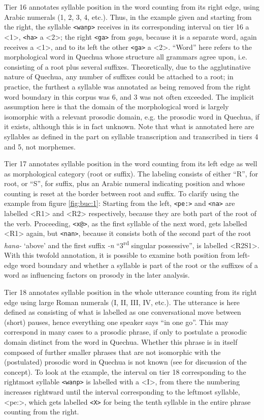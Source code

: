 \documentclass[output=paper]{LSP/langsci}
\begin{document}
Tier 16 annotates syllable position in the word counting from its right edge, using Arabic numerals (1, 2, 3, 4, etc.). Thus, in the example given and starting from the right, the syllable \texttt{<wanp>} receives in its corresponding interval on tier 16 a <1>, \texttt{<ha>} a <2>; the right \texttt{<ga>} from \textit{gaga}, because it is a separate word, again receives a <1>, and to its left the other \texttt{<ga>} a <2>. “Word” here refers to the morphological word in Quechua whose structure all grammars agree upon, i.e. consisting of a root plus several suffixes. Theoretically, due to the agglutinative nature of Quechua, any number of suffixes could be attached to a root; in practice, the furthest a syllable was annotated as being removed from the right word boundary in this corpus was 6, and 3 was not often exceeded. The implicit assumption here is that the domain of the morphological word is largely isomorphic with a relevant prosodic domain, e.g. the prosodic word in Quechua, if it exists, although this is in fact unknown. Note that what is annotated here are syllables as defined in the part on syllable transcription and transcribed in tiers 4 and 5, not morphemes.\largerpage[-1] 

Tier 17 annotates syllable position in the word counting from its left edge as well as morphological category (root or suffix). The labeling consists of either “R”, for root, or “S”, for suffix, plus an Arabic numeral indicating position and whose counting is reset at the border between root and suffix. To clarify using the example from figure \ref{fig:buc:1}: Starting from the left, \texttt{<pe\textipa:>} and \texttt{<na>} are labelled <R1> and <R2> respectively, because they are both part of the root of the verb. Proceeding, \texttt{<x@>}, as the first syllable of the next word, gets labelled <R1> again, but \texttt{<nan>}, because it consists both of the second part of the root \textit{hana-} `above' and the first suffix \textit{-n} ``3\textsuperscript{rd} singular possessive'', is labelled <R2S1>. With this twofold annotation, it is possible to examine both position from left-edge word boundary and whether a syllable is part of the root or the suffixes of a word as influencing factors on prosody in the later analysis.      

Tier 18 annotates syllable position in the whole utterance counting from its right edge using large Roman numerals (I, II, III, IV, etc.). The utterance is here defined as consisting of what is labelled as one conversational move between (short) pauses, hence everything one speaker says “in one go”. This may correspond in many cases to a prosodic phrase, if only to postulate a prosodic domain distinct from the word in Quechua. Whether this phrase is in itself composed of further smaller phrases that are not isomorphic with the (postulated) prosodic word in Quechua is not known (see \citealt{Grice2000} for discussion of the concept). To look at the example, the interval on tier 18 corresponding to the rightmost syllable \texttt{<wanp>} is labelled with a <I>, from there the numbering increases rightward until the interval corresponding to the leftmost syllable, <pe\textipa:>, which gets labelled \texttt{<X>} for being the tenth syllable in the entire phrase counting from the right. 
\end{document}
